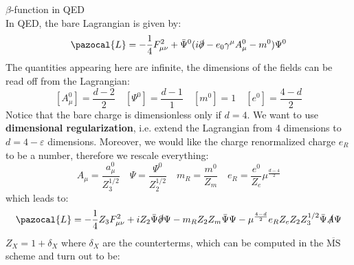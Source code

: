 \documentclass[../main.tex]{subfiles}
\begin{document}
\begin{example}$\beta$-function in QED\\
In QED, the bare Lagrangian is given by:
\[
\pazocal{L}=-\frac{1}{4}F^2_{\mu\nu}+\Bar{\Psi}^0(i\slashed{\partial}-e_0\gamma^\mu A_\mu^0-m^0)\Psi^0
\]
The quantities appearing here are infinite, the dimensions of the fields can be read off from the Lagrangian:
\[
[A_\mu^0]=\frac{d-2}{2} \quad [\Psi^0]=\frac{d-1}{1} \quad [m^0]=1 \quad [e^0]=\frac{4-d}{2}
\]
Notice that the bare charge is dimensionless only if $d=4$. We want to use \textbf{dimensional regularization}, i.e. extend the Lagrangian from 4 dimensions to $d=4-\varepsilon$ dimensions. Moreover, we would like the charge renormalized charge $e_R$ to be a number, therefore we rescale everything:
\[
A_\mu=\frac{a_\mu^0}{Z_3^{1/2}} \quad \Psi=\frac{\Psi^0}{Z_2^{1/2}} \quad m_R=\frac{m^0}{Z_m} \quad e_R=\frac{e^0}{Z_e}\mu^{\frac{d-4}{2}}
\]
which leads to:
\[
\pazocal{L}=-\frac{1}{4}Z_3F_{\mu\nu}^2+iZ_2\Bar{\Psi}\slashed{\partial}\Psi-m_RZ_2Z_m\Bar{\Psi}\Psi-\mu^{\frac{4-d}{2}}e_RZ_eZ_2Z_3^{1/2}\Bar{\Psi}\slashed{A}\Psi
\]
$Z_X=1+\delta_X$ where $\delta_X$ are the counterterms, which can be computed in the $\overline{\text{MS}}$ scheme and turn out to be:
\begin{align*}

\end{align*}
\end{example}
\end{document}
